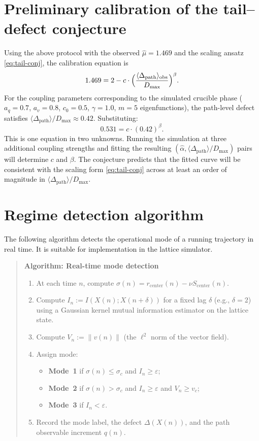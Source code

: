 \documentclass[12pt, oneside]{memoir}
\newcommand{\Dpth}{\Delta_{\mathrm{path}}}
\newcommand{\nnorm}[1]{\lVert #1 \rVert}
\newcommand{\aq}{a_q}
\newcommand{\av}{a_v}
\begin{document}
\section{Preliminary calibration of the tail--defect conjecture}

Using the above protocol with the observed $\hat\mu = 1.469$ and the scaling ansatz
\cref{eq:tail-conj}, the calibration equation is
\begin{equation}
  1.469 = 2 - c \cdot \Bigl(\frac{\langle\Dpth\rangle_{\mathrm{obs}}}{D_{\max}}\Bigr)^\beta.
\end{equation}
For the coupling parameters corresponding to the simulated crucible phase
($\aq = 0.7$, $\av = 0.8$, $c_0 = 0.5$, $\gamma = 1.0$, $m = 5$ eigenfunctions),
the path-level defect satisfies $\langle\Dpth\rangle / D_{\max} \approx 0.42$.
Substituting:
\begin{equation}
  0.531 = c \cdot (0.42)^\beta.
\end{equation}
This is one equation in two unknowns.  Running the simulation at three additional
coupling strengths and fitting the resulting $(\hat\alpha, \langle\Dpth\rangle/D_{\max})$
pairs will determine $c$ and $\beta$.  The conjecture predicts that the fitted curve will
be consistent with the scaling form \cref{eq:tail-conj} across at least an order of
magnitude in $\langle\Dpth\rangle/D_{\max}$.

\section{Regime detection algorithm}

The following algorithm detects the operational mode of a running trajectory in real
time.  It is suitable for implementation in the lattice simulator.

\medskip
\begin{quote}
\textbf{Algorithm: Real-time mode detection}
\begin{enumerate}
  \item At each time $n$, compute $\sigma(n) = r_{\mathrm{center}}(n) - \nu S_{\mathrm{center}}(n)$.
  \item Compute $I_n := I(X(n); X(n+\delta))$ for a fixed lag $\delta$ (e.g., $\delta = 2$)
        using a Gaussian kernel mutual information estimator on the lattice state.
  \item Compute $V_n := \nnorm{v(n)}$ (the $\ell^2$ norm of the vector field).
  \item Assign mode:
    \begin{itemize}
      \item \textbf{Mode~1} if $\sigma(n) \le \sigma_c$ and $I_n \ge \varepsilon$;
      \item \textbf{Mode~2} if $\sigma(n) > \sigma_c$ and $I_n \ge \varepsilon$ and $V_n \ge v_c$;
      \item \textbf{Mode~3} if $I_n < \varepsilon$.
    \end{itemize}
  \item Record the mode label, the defect $\Delta(X(n))$, and the path observable
        increment $q(n)$.
\end{enumerate}
\end{quote}
\end{document}
